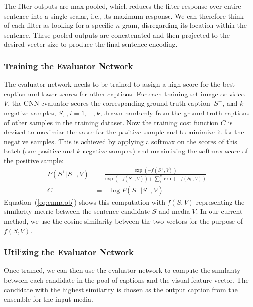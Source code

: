 The filter outputs are max-pooled, which reduces the filter response over entire
sentence into a single scalar, i.e., its maximum response. 
We can therefore think of each filter as looking for a specific $n$-gram,
disregarding its location within the sentence.
These pooled outputs are concatenated and then projected to the desired vector
size to produce the final sentence encoding.


\subsubsection{Training the Evaluator Network}

The evaluator network needs to be trained to assign a high score for the best
caption and lower scores for other captions.
For each training set image or video $V$, the CNN evaluator scores the
corresponding ground truth caption, $S^+$, and $k$ negative samples, $S_i^-,
i=1,\ldots,k$, drawn randomly from the ground truth captions of other samples in
the training dataset.
Now the training cost function $C$ is devised to maximize the score for the
positive sample and to minimize it for the negative samples. 
This is achieved by applying a softmax on the scores of this batch (one positive
and $k$ negative samples) and maximizing the softmax score of the positive sample:
\begin{align}
  \label{eq:cnnprob} 
  P(S^+|S^-,V) &= \frac{\exp(-f(S^+,V))}{\exp(-f(S^+,V)) +
           \sum\limits_i^k{\exp(-f(S_i^- ,V))}} \\
  C &= -\log P(S^+|S^-,V) \;.
\end{align}
Equation~(\ref{eq:cnnprob}) shows this computation with $f(S,V)$ representing
the similarity metric between the sentence candidate $S$ and media $V$.
In our current method, we use the cosine similarity between the two vectors for
the purpose of $f(S,V)$.


\subsubsection{Utilizing the Evaluator Network}

Once trained, we can then use the evaluator network to compute the similarity
between each candidate in the pool of captions and the visual feature vector. 
The candidate with the highest similarity is chosen as the output caption from
the ensemble for the input media.

